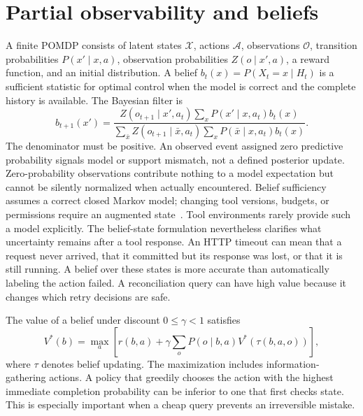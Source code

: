 \section{Partial observability and beliefs}\label{sec:C02:03}
A finite POMDP consists of latent states $\mathcal X$, actions $\mathcal A$, observations $\mathcal O$, transition probabilities $P(x'\mid x,a)$, observation probabilities $Z(o\mid x',a)$, a reward function, and an initial distribution. A belief $b_t(x)=P(X_t=x\mid H_t)$ is a sufficient statistic for optimal control when the model is correct and the complete history is available. The Bayesian filter is
\begin{equation}
 b_{t+1}(x')=
 \frac{Z(o_{t+1}\mid x',a_t)
 \sum_xP(x'\mid x,a_t)b_t(x)}
 {\sum_{\bar x}Z(o_{t+1}\mid\bar x,a_t)
 \sum_xP(\bar x\mid x,a_t)b_t(x)}.
\end{equation}
The denominator must be positive. An observed event assigned zero predictive probability signals model or support mismatch, not a defined posterior update. Zero-probability observations contribute nothing to a model expectation but cannot be silently normalized when actually encountered. Belief sufficiency assumes a correct closed Markov model; changing tool versions, budgets, or permissions require an augmented state~\cite{ch02_pomdp1998}. Tool environments rarely provide such a model explicitly. The belief-state formulation nevertheless clarifies what uncertainty remains after a tool response. An HTTP timeout can mean that a request never arrived, that it committed but its response was lost, or that it is still running. A belief over these states is more accurate than automatically labeling the action failed. A reconciliation query can have high value because it changes which retry decisions are safe.

The value of a belief under discount $0\leq\gamma<1$ satisfies
\begin{equation}
 V^*(b)=\max_a\left[r(b,a)+
 \gamma\sum_oP(o\mid b,a)V^*(\tau(b,a,o))\right],
\end{equation}
where $\tau$ denotes belief updating. The maximization includes information-gathering actions. A policy that greedily chooses the action with the highest immediate completion probability can be inferior to one that first checks state. This is especially important when a cheap query prevents an irreversible mistake.

